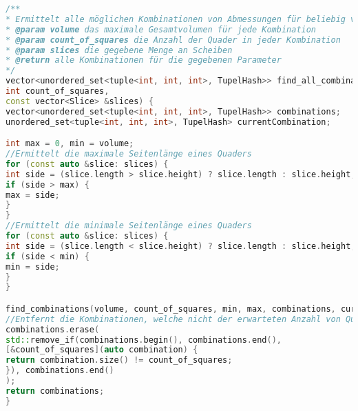 \documentclass[a4paper,10pt,ngerman]{scrartcl}
\begin{document}
    \begin{lstlisting}[frame=single,language=C++,title=Methode find\_all\_combinations,breaklines=true,label={lst:code_findAllCombinations}]
/**
* Ermittelt alle möglichen Kombinationen von Abmessungen für beliebig viele Quader
* @param volume das maximale Gesamtvolumen für jede Kombination
* @param count_of_squares die Anzahl der Quader in jeder Kombination
* @param slices die gegebene Menge an Scheiben
* @return alle Kombinationen für die gegebenen Parameter
*/
vector<unordered_set<tuple<int, int, int>, TupelHash>> find_all_combinations(int volume,
int count_of_squares,
const vector<Slice> &slices) {
vector<unordered_set<tuple<int, int, int>, TupelHash>> combinations;
unordered_set<tuple<int, int, int>, TupelHash> currentCombination;

int max = 0, min = volume;
//Ermittelt die maximale Seitenlänge eines Quaders
for (const auto &slice: slices) {
int side = (slice.length > slice.height) ? slice.length : slice.height;
if (side > max) {
max = side;
}
}
//Ermittelt die minimale Seitenlänge eines Quaders
for (const auto &slice: slices) {
int side = (slice.length < slice.height) ? slice.length : slice.height;
if (side < min) {
min = side;
}
}

find_combinations(volume, count_of_squares, min, max, combinations, currentCombination);
//Entfernt die Kombinationen, welche nicht der erwarteten Anzahl von Quadern entsprechen
combinations.erase(
std::remove_if(combinations.begin(), combinations.end(),
[&count_of_squares](auto combination) {
return combination.size() != count_of_squares;
}), combinations.end()
);
return combinations;
}
    \end{lstlisting}
\end{document}
